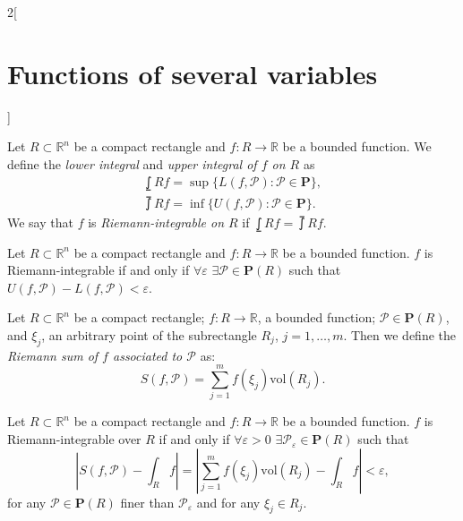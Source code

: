 \documentclass[../../../main.tex]{subfiles}
\begin{document}
\begin{multicols}{2}[\section{Functions of several variables}]
\begin{definition}
Let $R\subset\mathbb{R}^n$ be a compact rectangle and $f:R\rightarrow\mathbb{R}$ be a bounded function. We define the \textit{lower integral} and \textit{upper integral of $f$ on $R$} as 
\begin{gather*}
    \lowint{R}{}f=\sup\{L(f,\mathcal{P}):\mathcal{P}\in\textbf{P}\},\\
    \upint{R}{}f=\inf\{U(f,\mathcal{P}):\mathcal{P}\in\textbf{P}\}.
\end{gather*} We say that $f$ is \textit{Riemann-integrable on $R$} if $\displaystyle\lowint{R}{}f=\upint{R}{}f$.
\end{definition}
\begin{prop}
Let $R\subset\mathbb{R}^n$ be a compact rectangle and $f:R\rightarrow\mathbb{R}$ be a bounded function. $f$ is Riemann-integrable if and only if $\forall\varepsilon$ $\exists\mathcal{P}\in\textbf{P}(R)$ such that $U(f,\mathcal{P})-L(f,\mathcal{P})<\varepsilon$.
\end{prop}
\begin{definition}
Let $R\subset\mathbb{R}^n$ be a compact rectangle; $f:R\rightarrow\mathbb{R}$, a bounded function; $\mathcal{P}\in\textbf{P}(R)$, and $\xi_j$, an arbitrary point of the subrectangle $R_j$, $j=1,\ldots,m$. Then we define the \textit{Riemann sum of $f$ associated to $\mathcal{P}$} as: $$S(f,\mathcal{P})=\sum_{j=1}^mf(\xi_j)\text{vol}(R_j).$$
\end{definition}
\begin{theorem}
Let $R\subset\mathbb{R}^n$ be a compact rectangle and $f:R\rightarrow\mathbb{R}$ be a bounded function. $f$ is Riemann-integrable over $R$ if and only if $\forall\varepsilon>0$ $\exists\mathcal{P}_\varepsilon\in\textbf{P}(R)$ such that $$\left|S(f,\mathcal{P})-\int_Rf\right|=\left|\sum_{j=1}^mf(\xi_j)\text{vol}(R_j)-\int_Rf\right|<\varepsilon,$$ for any $\mathcal{P}\in\textbf{P}(R)$ finer than $\mathcal{P}_\varepsilon$ and for any $\xi_j\in R_j$.
\end{theorem}

\end{multicols}
\end{document}
